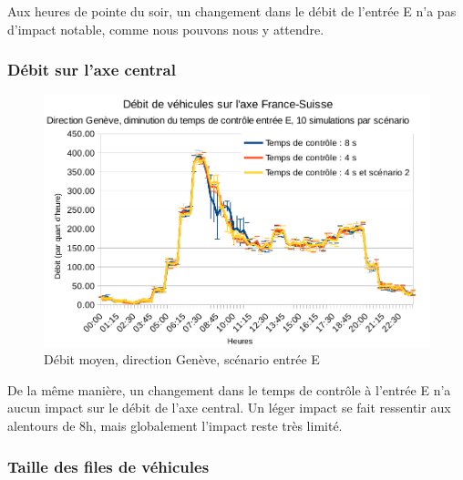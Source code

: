 \documentclass[a4paper,11pt, titlepage]{extarticle}
\begin{document}
\vspace{0.4cm}

Aux heures de pointe du soir, un changement dans le débit de l'entrée E n'a pas d'impact notable, comme nous pouvons nous y attendre.

\subsubsection{Débit sur l'axe central}

\begin{figure}[!h]
  \begin{center}
    \includegraphics[width=13cm]{graphiques/compteur_1a_entreeE.png}
  \end{center}
  \vspace{-0.8cm}
  \caption{Débit moyen, direction Genève, scénario entrée E}
  \label{graphCompteur1AScenarioE}
\end{figure}

De la même manière, un changement dans le temps de contrôle à l'entrée E n'a aucun impact sur le débit de l'axe central. Un léger impact se fait ressentir aux alentours de 8h, mais globalement l'impact reste très limité.

\newpage

\subsubsection{Taille des files de véhicules}
\end{document}
